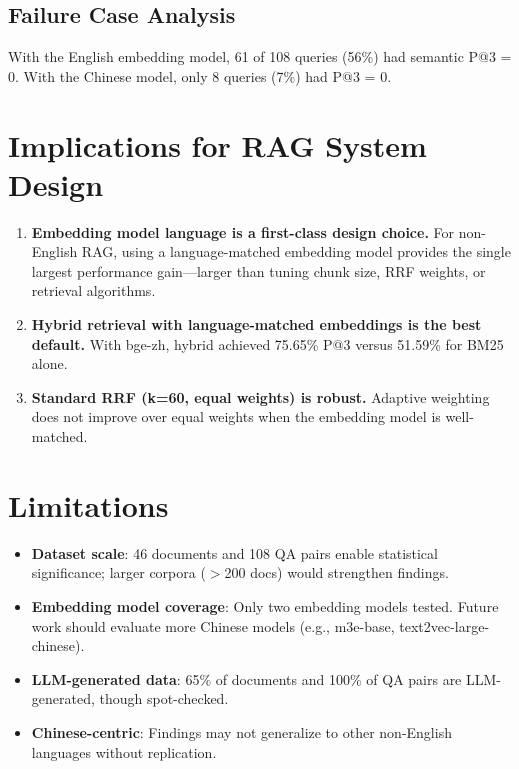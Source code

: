 ﻿\documentclass[11pt,a4paper]{article}
\begin{document}
\subsection{Failure Case Analysis}

With the English embedding model, 61 of 108 queries (56\%) had semantic P@3 = 0. With the Chinese model, only 8 queries (7\%) had P@3 = 0.

\section{Implications for RAG System Design}

\begin{enumerate}[nosep]
    \item \textbf{Embedding model language is a first-class design choice.} For non-English RAG, using a language-matched embedding model provides the single largest performance gain---larger than tuning chunk size, RRF weights, or retrieval algorithms.
    \item \textbf{Hybrid retrieval with language-matched embeddings is the best default.} With bge-zh, hybrid achieved 75.65\% P@3 versus 51.59\% for BM25 alone.
    \item \textbf{Standard RRF (k=60, equal weights) is robust.} Adaptive weighting does not improve over equal weights when the embedding model is well-matched.
\end{enumerate}

\section{Limitations}

\begin{itemize}[nosep]
    \item \textbf{Dataset scale}: 46 documents and 108 QA pairs enable statistical significance; larger corpora ($>$200 docs) would strengthen findings.
    \item \textbf{Embedding model coverage}: Only two embedding models tested. Future work should evaluate more Chinese models (e.g., m3e-base, text2vec-large-chinese).
    \item \textbf{LLM-generated data}: 65\% of documents and 100\% of QA pairs are LLM-generated, though spot-checked.
    \item \textbf{Chinese-centric}: Findings may not generalize to other non-English languages without replication.
\end{itemize}
\end{document}
